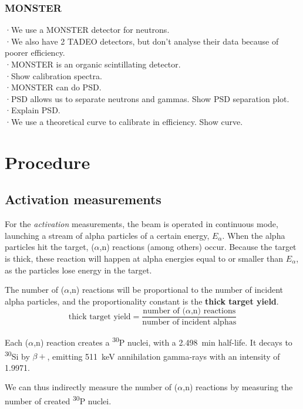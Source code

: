 \documentclass[a4paper,12pt]{report}
\newcommand{\an}{($\alpha$,n) }
\newcommand{\Piso}{\textsuperscript{30}P }
\begin{document}
\subsubsection{MONSTER}
·We use a MONSTER detector for neutrons.\\
·We also have 2 TADEO detectors, but don't analyse their data because of poorer efficiency.\\
·MONSTER is an organic scintillating detector.\\
·Show calibration spectra.\\
·MONSTER can do PSD.\\
·PSD allows us to separate neutrons and gammas. Show PSD separation plot.\\
·Explain PSD.\\
·We use a theoretical curve to calibrate in efficiency. Show curve.\\

\section{Procedure}
\subsection{Activation measurements}
For the \textit{activation} measurements, the beam is operated in continuous mode, launching a stream of alpha particles of a certain energy, $E_\alpha$.
When the alpha particles hit the target, \an reactions (among others) occur.
Because the target is thick, these reaction will happen at alpha energies equal to or smaller than $E_\alpha$, as the particles lose energy in the target.

The number of \an reactions will be proportional to the number of incident alpha particles, and the proportionality constant is the \textbf{thick target yield}.
\begin{equation}
	\text{thick target yield} = \frac{\text{number of \an reactions}}{\text{number of incident alphas}}
\end{equation}

Each \an reaction creates a \Piso nuclei, with a \qty{2.498}{\minute} half-life.
It decays to \textsuperscript{30}Si by $\beta +$, emitting \qty{511}{\keV} annihilation gamma-rays with an intensity of \num{1.9971}.\cite{nucleardatasheets}

We can thus indirectly measure the number of \an reactions by measuring the number of created \Piso nuclei.
\\
\end{document}
